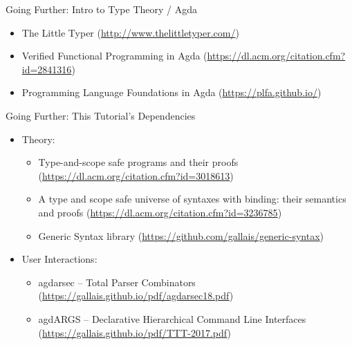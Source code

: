 \documentclass{beamer}
\begin{document}
\begin{frame}{Going Further: Intro to Type Theory / Agda}

\begin{itemize}
  \item The Little Typer (\url{http://www.thelittletyper.com/})
  \item Verified Functional Programming in Agda (\url{https://dl.acm.org/citation.cfm?id=2841316})
  \item Programming Language Foundations in Agda (\url{https://plfa.github.io/})
\end{itemize}
\end{frame}

\begin{frame}{Going Further: This Tutorial's Dependencies}

\begin{itemize}
  \item Theory:
    \begin{itemize}
      \item Type-and-scope safe programs and their proofs (\url{https://dl.acm.org/citation.cfm?id=3018613})
      \item A type and scope safe universe of syntaxes with binding: their semantics and proofs (\url{https://dl.acm.org/citation.cfm?id=3236785})

      \item Generic Syntax library (\url{https://github.com/gallais/generic-syntax})
    \end{itemize}
  \item User Interactions:
    \begin{itemize}
      \item agdarsec -- Total Parser Combinators (\url{https://gallais.github.io/pdf/agdarsec18.pdf})
      \item agdARGS -- Declarative Hierarchical Command Line Interfaces (\url{https://gallais.github.io/pdf/TTT-2017.pdf})
    \end{itemize}
\end{itemize}
\end{frame}
\end{document}

